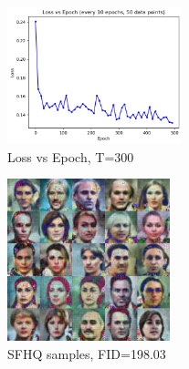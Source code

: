 \documentclass[letterpaper]{article} %
\begin{document}
\begin{figure}[htbp]
    \centering
    \includegraphics[width=0.45\textwidth]{f6.png} %
    \caption{Loss vs Epoch, T=300}
    \label{fig:figure7}
\end{figure}

\begin{figure}[htbp]
    \centering
    \includegraphics[width=0.42\textwidth]{f7.jpg}
    \caption{SFHQ samples, FID=198.03}
    \label{fig:high}
\end{figure}



\end{document}
